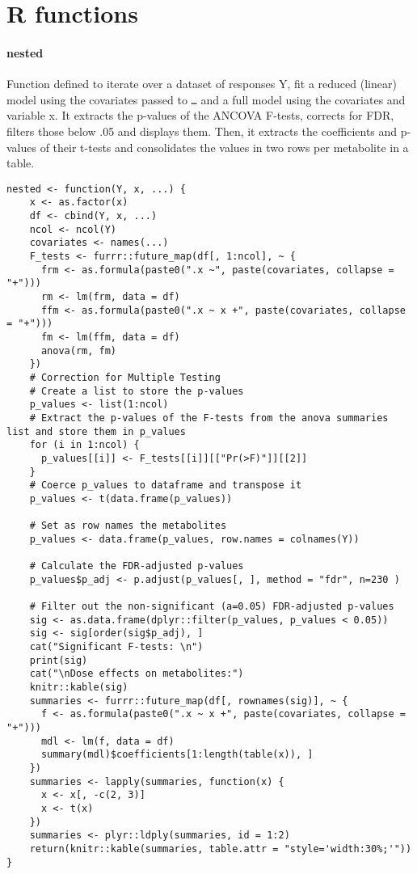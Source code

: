 \section{R functions}
\paragraph{nested} \label{app:nested}
Function defined to iterate over a dataset of responses Y, fit a reduced (linear) model using the covariates passed to \texttt{\dots} and a full model using the covariates and variable x. It extracts the p-values of the ANCOVA F-tests, corrects for FDR, filters those below .05 and displays them. Then, it extracts the coefficients and p-values of their t-tests and consolidates the values in two rows per  metabolite in a table.
\begin{verbatim}
nested <- function(Y, x, ...) {
    x <- as.factor(x)
    df <- cbind(Y, x, ...)
    ncol <- ncol(Y)
    covariates <- names(...)
    F_tests <- furrr::future_map(df[, 1:ncol], ~ {
      frm <- as.formula(paste0(".x ~", paste(covariates, collapse = "+")))
      rm <- lm(frm, data = df)
      ffm <- as.formula(paste0(".x ~ x +", paste(covariates, collapse = "+")))
      fm <- lm(ffm, data = df)
      anova(rm, fm)
    })
    # Correction for Multiple Testing
    # Create a list to store the p-values
    p_values <- list(1:ncol)
    # Extract the p-values of the F-tests from the anova summaries list and store them in p_values
    for (i in 1:ncol) {
      p_values[[i]] <- F_tests[[i]][["Pr(>F)"]][[2]]
    }
    # Coerce p_values to dataframe and transpose it
    p_values <- t(data.frame(p_values))

    # Set as row names the metabolites
    p_values <- data.frame(p_values, row.names = colnames(Y))

    # Calculate the FDR-adjusted p-values
    p_values$p_adj <- p.adjust(p_values[, ], method = "fdr", n=230 )

    # Filter out the non-significant (a=0.05) FDR-adjusted p-values
    sig <- as.data.frame(dplyr::filter(p_values, p_values < 0.05))
    sig <- sig[order(sig$p_adj), ]
    cat("Significant F-tests: \n")
    print(sig)
    cat("\nDose effects on metabolites:")
    knitr::kable(sig)
    summaries <- furrr::future_map(df[, rownames(sig)], ~ {
      f <- as.formula(paste0(".x ~ x +", paste(covariates, collapse = "+")))
      mdl <- lm(f, data = df)
      summary(mdl)$coefficients[1:length(table(x)), ]
    })
    summaries <- lapply(summaries, function(x) {
      x <- x[, -c(2, 3)]
      x <- t(x)
    })
    summaries <- plyr::ldply(summaries, id = 1:2)
    return(knitr::kable(summaries, table.attr = "style='width:30%;'"))
}
\end{verbatim}

